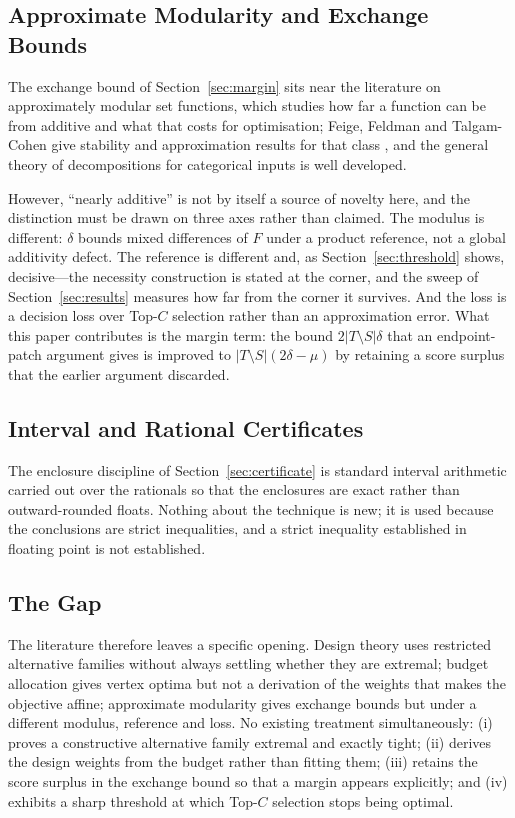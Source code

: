 \documentclass[conference]{IEEEtran}
\theoremstyle{definition}
\begin{document}
\subsection{Approximate Modularity and Exchange Bounds}

The exchange bound of Section~\ref{sec:margin} sits near the literature on approximately
modular set functions, which studies how far a function can be from additive and what that
costs for optimisation; Feige, Feldman and Talgam-Cohen give stability and approximation
results for that class \cite{feige2020}, and the general theory of decompositions for
categorical inputs is well developed.

However, ``nearly additive'' is not by itself a source of novelty here, and the distinction
must be drawn on three axes rather than claimed. The modulus is different: $\delta$ bounds
mixed differences of $F$ under a product reference, not a global additivity defect. The
reference is different and, as Section~\ref{sec:threshold} shows, decisive---the necessity
construction is stated at the corner, and the sweep of Section~\ref{sec:results} measures how
far from the corner it survives. And the loss is a decision loss over
Top-$C$ selection rather than an approximation error. What this paper contributes is the
margin term: the bound $2|T\setminus S|\delta$ that an endpoint-patch argument gives is
improved to $|T\setminus S|(2\delta-\mu)$ by retaining a score surplus that the earlier
argument discarded.

\subsection{Interval and Rational Certificates}

The enclosure discipline of Section~\ref{sec:certificate} is standard interval arithmetic
\cite{moore2009} carried out over the rationals so that the enclosures are exact rather than
outward-rounded floats. Nothing about the technique is new; it is used because the
conclusions are strict inequalities, and a strict inequality established in floating point is
not established.

\subsection{The Gap}

The literature therefore leaves a specific opening. Design theory uses restricted alternative
families without always settling whether they are extremal; budget allocation gives vertex
optima but not a derivation of the weights that makes the objective affine; approximate
modularity gives exchange bounds but under a different modulus, reference and loss. No
existing treatment simultaneously: (i) proves a constructive alternative family extremal and
exactly tight; (ii) derives the design weights from the budget rather than fitting them;
(iii) retains the score surplus in the exchange bound so that a margin appears explicitly;
and (iv) exhibits a sharp threshold at which Top-$C$ selection stops being optimal.
\end{document}
